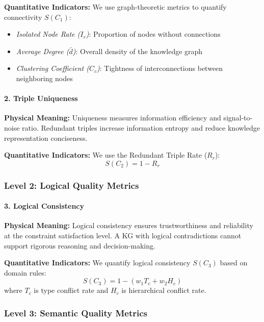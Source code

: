 \documentclass[runningheads]{llncs}
\begin{document}
\textbf{Quantitative Indicators:} We use graph-theoretic metrics to quantify connectivity $S(C_1)$:
\begin{itemize}
    \item \textit{Isolated Node Rate ($I_r$)}: Proportion of nodes without connections
    \item \textit{Average Degree ($\bar{d}$)}: Overall density of the knowledge graph
    \item \textit{Clustering Coefficient ($C_c$)}: Tightness of interconnections between neighboring nodes
\end{itemize}

\paragraph{2. Triple Uniqueness}
\textbf{Physical Meaning:} Uniqueness measures information efficiency and signal-to-noise ratio. Redundant triples increase information entropy and reduce knowledge representation conciseness.

\textbf{Quantitative Indicators:} We use the Redundant Triple Rate ($R_r$):
\begin{equation}
\label{eq:uniqueness_score}
S(C_2) = 1 - R_r
\end{equation}

\subsubsection{Level 2: Logical Quality Metrics}

\paragraph{3. Logical Consistency}
\textbf{Physical Meaning:} Logical consistency ensures trustworthiness and reliability at the constraint satisfaction level. A KG with logical contradictions cannot support rigorous reasoning and decision-making.

\textbf{Quantitative Indicators:} We quantify logical consistency $S(C_3)$ based on domain rules:
\begin{equation}
\label{eq:consistency_score}
S(C_3) = 1 - (w_1 T_c + w_2 H_c)
\end{equation}
where $T_c$ is type conflict rate and $H_c$ is hierarchical conflict rate.

\subsubsection{Level 3: Semantic Quality Metrics}
\end{document}

